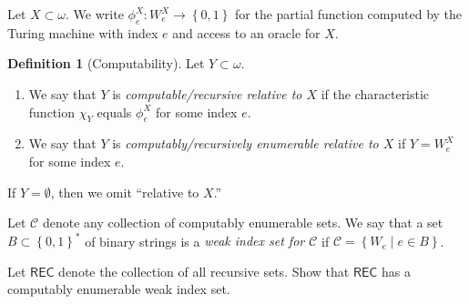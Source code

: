 \documentclass[10pt,letterpaper,cm]{nupset}
\theoremstyle{definition}
\newtheorem{definition}{Definition}
\theoremstyle{theorem}
\theoremstyle{remark}
\newcommand{\1}{\mathbb{1}}
\newcommand{\0}{\vec 0}
\newcommand{\be}{\begin{enumerate}}
\newcommand{\ee}{\end{enumerate}}
\begin{document}
\medskip

Let $X\subset \omega$. We write $\phi_e^X: W_e^X \to \left\{0,1\right\}$ for the partial function computed by the Turing machine with index $e$ and access to an oracle for $X$. 

\begin{definition}[Computability] Let $Y\subset \omega$.
\be
\item We say that $Y$ is \textit{computable/recursive relative to $X$} if the characteristic function $\chi_Y$ equals $\phi_e^X$ for some index $e$.
\item We say that $Y$ is \textit{computably/recursively enumerable relative to $X$} if $Y= W_e^X$ for some index $e$.
\ee
If $Y= \emptyset$, then we omit ``relative to $X$.''
\end{definition}

Let $\mathcal{C}$ denote any collection of computably enumerable sets. We say that a set $B\subset \left\{0,1\right\}^{\ast}$ of binary strings is a \textit{weak index set for $\mathcal{C}$} if $\mathcal{C} = \left\{W_e \mid e \in B\right\}$. 

\begin{problem}[8.]
Let $\mathsf{REC}$ denote the collection of all recursive sets. Show that $\mathsf{REC}$ has a computably enumerable weak index set.
\end{problem}
\begin{solution}

\end{solution}
\end{document}
